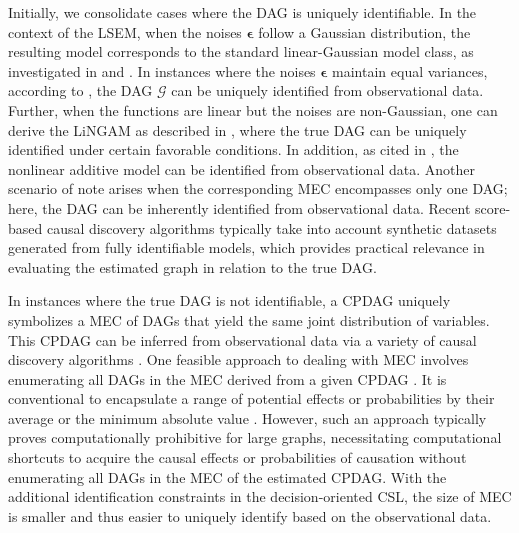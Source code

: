 Initially, we consolidate cases where the DAG is uniquely identifiable. In the context of the \acrshort{LSEM}, when the noises $\boldsymbol{\epsilon}$ follow a Gaussian distribution, the resulting model corresponds to the standard linear-Gaussian model class, as investigated in \citet{spirtes2000constructing} and \citet{peters2017elements}. In instances where the noises $\boldsymbol{\epsilon}$ maintain equal variances, according to \citet{peters2014identifiability}, the \acrshort{DAG} $\mathcal{G}$ can be uniquely identified from observational data. Further, when the functions are linear but the noises are non-Gaussian, one can derive the LiNGAM as described in \citet{shimizu2006linear}, where the true \acrshort{DAG} can be uniquely identified under certain favorable conditions. In addition, as cited in \citet{zheng2020learning,rolland2022score}, the nonlinear additive model can be identified from observational data. Another scenario of note arises when the corresponding \acrshort{MEC} encompasses only one \acrshort{DAG}; here, the \acrshort{DAG} can be inherently identified from observational data. Recent score-based causal discovery algorithms \citep{zheng2018dags,yu2019dag,zhu2019causal,cai2020anoce} typically take into account synthetic datasets generated from fully identifiable models, which provides practical relevance in evaluating the estimated graph in relation to the true \acrshort{DAG}.

In instances where the true \acrshort{DAG} is not identifiable, a \acrshort{CPDAG} uniquely symbolizes a MEC of DAGs that yield the same joint distribution of variables. This \acrshort{CPDAG} can be inferred from observational data via a variety of causal discovery algorithms \citep[see e.g.,][]{spirtes2000constructing,chickering2002optimal,shimizu2006linear,kalisch2007estimating,harris2013pc,buhlmann2014cam,ramsey2017million,zhang2018non}. One feasible approach to dealing with \acrshort{MEC} involves enumerating all \acrshort{DAG}s in the \acrshort{MEC} derived from a given \acrshort{CPDAG} \citep{chakrabortty2018inference}. It is conventional to encapsulate a range of potential effects or probabilities by their average or the minimum absolute value \citep{chakrabortty2018inference,shi2021testing}. However, such an approach typically proves computationally prohibitive for large graphs, necessitating computational shortcuts to acquire the causal effects or probabilities of causation without enumerating all \acrshort{DAG}s in the \acrshort{MEC} of the estimated \acrshort{CPDAG}. With the additional identification constraints in the decision-oriented \acrshort{CSL}, the size of \acrshort{MEC} is smaller and thus easier to uniquely identify based on the observational data.

